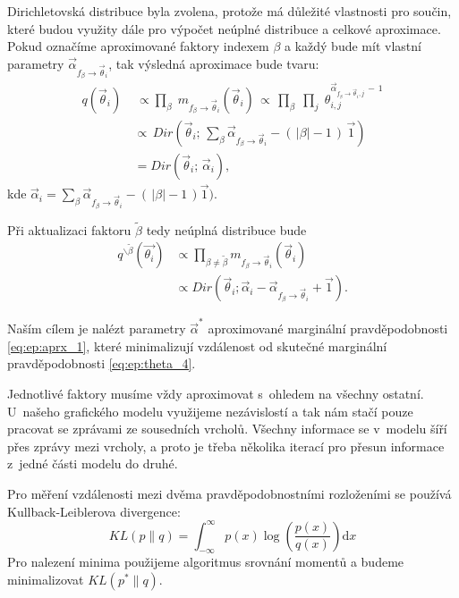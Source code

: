 Dirichletovská distribuce byla zvolena, protože má důležité vlastnosti pro
součin, které budou využity dále pro výpočet neúplné distribuce a celkové
aproximace. Pokud označíme aproximované faktory indexem $\beta$ a každý bude
mít vlastní parametry $\vec\alpha_{f_\beta \rightarrow \vec\theta_i}$, tak výsledná aproximace bude
tvaru:
\begin{align}
q(\vec{\theta}_i) \,& \, \propto
    \prod_\beta \;
    m_{f_\beta \rightarrow \vec{\theta}_i}(\vec{\theta}_i) \,
 \propto \,
    \prod_\beta \;
        \prod_j \;
            \theta_{i,j}^{\vec\alpha_{f_\beta \rightarrow \vec\theta_i, j} \,-\, 1}
\\
&\propto \,
    Dir(\vec{\theta}_i ;\, \sum_\beta \vec\alpha_{f_\beta \rightarrow \vec\theta_i} - (\,|\beta| - 1\,) \, \vec{1})
\\
&=
    Dir(\vec{\theta}_i;\,
        \vec{\alpha}_i),
\label{eq:ep:aprx_1}
\end{align}
kde $\vec{\alpha}_i = \sum_\beta \vec\alpha_{f_\beta \rightarrow \vec\theta_i} - (\,|\beta| - 1\,)
\vec{1})$.

Při aktualizaci faktoru $\tilde\beta$ tedy neúplná distribuce bude
\begin{align}
q^{\backslash \tilde\beta} (\vec{\theta_i})
&\propto
    \prod_{\beta \ne \tilde\beta}
        m_{f_\beta \rightarrow \vec{\theta}_i}(\vec{\theta}_i)
\\
& \propto
Dir(\vec{\theta}_i;
    \vec{\alpha}_i - \vec\alpha_{f_\beta \rightarrow \vec\theta_i} + \vec{1}).
\end{align}

Naším cílem je nalézt parametry $\vec{\alpha}^*$ aproximované marginální pravděpodobnosti \eqref{eq:ep:aprx_1}, které minimalizují vzdálenost od skutečné marginální pravděpodobnosti \eqref{eq:ep:theta_4}. 

Jednotlivé faktory musíme vždy aproximovat s~ohledem na všechny ostatní.
U~našeho grafického modelu využijeme nezávislostí a tak nám stačí pouze pracovat se zprávami ze sousedních vrcholů.
Všechny informace se v~modelu šíří přes zprávy mezi vrcholy, a proto je třeba několika iterací pro přesun informace z~jedné části modelu do druhé.

Pro měření vzdálenosti mezi dvěma pravděpodobnostními rozloženími se používá Kullback-Leiblerova divergence:
\begin{equation}
KL(p \| q) =
\int_{-\infty}^{\infty}
    p(x) \log\left(\frac{p(x)}{q(x)}\right) \mathrm{d}x
\end{equation}
Pro nalezení minima použijeme algoritmus srovnání momentů a budeme
minimalizovat $KL(p^*\| q)$.


